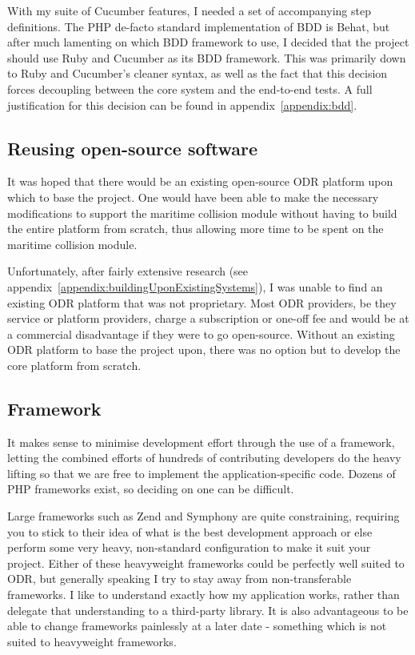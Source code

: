 With my suite of Cucumber features, I needed a set of accompanying step definitions. The PHP de-facto standard implementation of BDD is Behat,  but after much lamenting on which BDD framework to use, I decided that the project should use Ruby and Cucumber as its BDD framework. This was primarily down to Ruby and Cucumber's cleaner syntax, as well as the fact that this decision forces decoupling between the core system and the end-to-end tests. A full justification for this decision can be found in appendix~\ref{appendix:bdd}. 

\subsection{Reusing open-source software}

It was hoped that there would be an existing open-source ODR platform upon which to base the project. One would have been able to make the necessary modifications to support the maritime collision module without having to build the entire platform from scratch, thus allowing more time to be spent on the maritime collision module.

Unfortunately, after fairly extensive research (see appendix~\ref{appendix:buildingUponExistingSystems}), I was unable to find an existing ODR platform that was not proprietary. Most ODR providers, be they service or platform providers, charge a subscription or one-off fee and would be at a commercial disadvantage if they were to go open-source. Without an existing ODR platform to base the project upon, there was no option but to develop the core platform from scratch.

\subsection{Framework}

It makes sense to minimise development effort through the use of a framework, letting the combined efforts of hundreds of contributing developers do the heavy lifting so that we are free to implement the application-specific code. Dozens of PHP frameworks exist, so deciding on one can be difficult.

Large frameworks such as Zend and Symphony are quite constraining, requiring you to stick to their idea of what is the best development approach or else perform some very heavy, non-standard configuration to make it suit your project. Either of these heavyweight frameworks could be perfectly well suited to ODR, but generally speaking I try to stay away from non-transferable frameworks. I like to understand exactly how my application works, rather than delegate that understanding to a third-party library. It is also advantageous to be able to change frameworks painlessly at a later date - something which is not suited to heavyweight frameworks.

